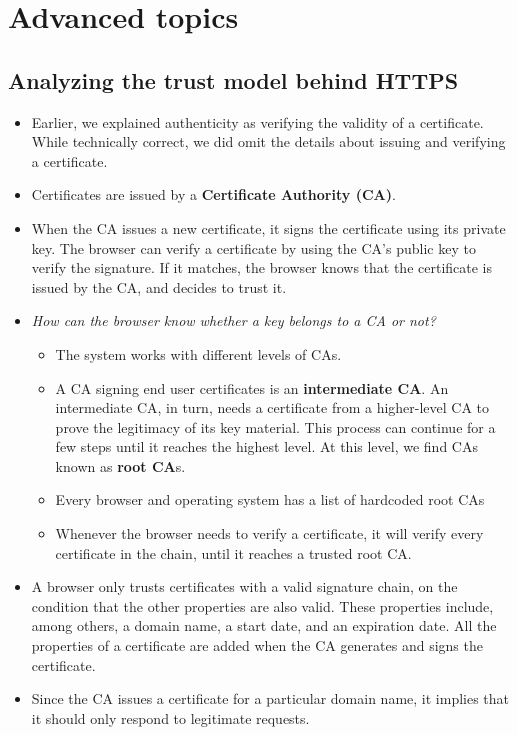 \documentclass[../main.tex]{subfiles}
\begin{document}
\section{Advanced topics}
\subsection{Analyzing the trust model behind HTTPS}
\begin{itemize}
\item Earlier, we explained authenticity as verifying the validity of a certificate. While technically correct, we did omit the details about issuing and verifying a certificate.
\item Certificates are issued by a \textbf{Certificate Authority (CA)}. 
\item When the CA issues a new certificate, it signs the certificate using its private key. The browser can verify a certificate by using the CA’s public key to verify the signature. If it matches, the browser knows that the certificate is issued by the CA, and decides to trust it.
\item \emph{How can the browser know whether a key belongs to a CA or not?}
\begin{itemize}
\item The system works with different levels of CAs.
\item A CA signing end user certificates is an \textbf{intermediate CA}. An intermediate CA, in turn, needs a certificate from a higher-level CA to prove the legitimacy of its key material. This process can continue for a few steps until it reaches the highest level. At this level, we find CAs known as \textbf{root CA}s.
\item Every browser and operating system has a list of hardcoded root CAs
\item Whenever the browser needs to verify a certificate, it will verify every certificate in the chain, until it reaches a trusted root CA.
\end{itemize}
\item A browser only trusts certificates with a valid signature chain, on the condition that the other properties are also valid. These properties include, among others, a domain name, a start date, and an expiration date. All the properties of a certificate are added when the CA generates and signs the certificate.
\item Since the CA issues a certificate for a particular domain name, it implies that it should only
respond to legitimate requests.

\end{itemize}
\end{document}
